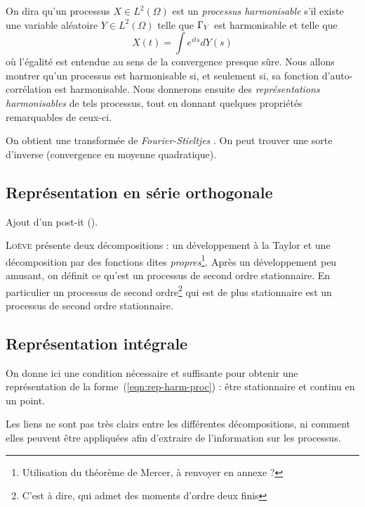 On dira qu'un processus $X\in L^2(\Omega)$ est un \emph{processus
  harmonisable} s'il existe une variable aléatoire $Y\in L^2(\Omega)$
telle que $\Gamma_Y$ est harmonisable et telle que
\begin{equation}
  \label{eqn:rep-harm-proc}
  X(t) = \int e^{its} dY(s)
\end{equation}
où l'égalité est entendue au sens de la convergence presque sûre. Nous
allons montrer qu'un processus est harmonisable si, et seulement si,
sa fonction d'auto-corrélation est harmonisable. Nous donnerons
ensuite des \emph{représentations harmonisables} de tels processus,
tout en donnant quelques propriétés remarquables de ceux-ci.

\begin{alert}
  On obtient une \og transformée de \emph{Fourier-Stieltjes} \fg{}. On
  peut trouver une sorte d'inverse (convergence en moyenne
  quadratique).
\end{alert}

\subsection{Représentation en série orthogonale}

\begin{alert}
  Ajout d'un post-it (\cite[p.~143]{loeve1978}).
\end{alert}

\textsc{Loève} présente deux décompositions : un développement à la
Taylor et une décomposition par des fonctions dites
\emph{propres}\footnote{Utilisation du théorème de Mercer, à renvoyer
  en annexe ?}. Après un développement peu amusant, on définit ce
qu'est un processus de second ordre stationnaire. En particulier un
processus de second ordre\footnote{C'est à dire, qui admet des moments
  d'ordre deux finis} qui est de plus stationnaire est un processus de
second ordre stationnaire.

\subsection{Représentation intégrale}
On donne ici une condition nécessaire et suffisante pour obtenir une
représentation de la forme~(\ref{eqn:rep-harm-proc}) : être
stationnaire et continu en un point.

\begin{alert}
  Les liens ne sont pas très clairs entre les différentes
  décompositions, ni comment elles peuvent être appliquées afin
  d'extraire de l'information sur les processus.
\end{alert}

